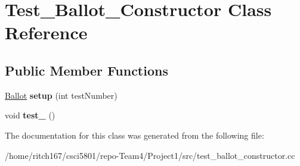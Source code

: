 \hypertarget{classTest__Ballot__Constructor}{}\section{Test\+\_\+\+Ballot\+\_\+\+Constructor Class Reference}
\label{classTest__Ballot__Constructor}
\subsection*{Public Member Functions}
\begin{DoxyCompactItemize}
\item 
\mbox{\label{classTest__Ballot__Constructor_a5c318b358ad6ad7e53a450a3e570a2aa}} 
\hyperlink{classBallot}{Ballot} {\bfseries setup} (int test\+Number)
\item 
\mbox{\label{classTest__Ballot__Constructor_a8236944b2cb7574bd431c7db00a3088c}} 
void {\bfseries test\+\_} ()
\end{DoxyCompactItemize}


The documentation for this class was generated from the following file\+:\begin{DoxyCompactItemize}
\item 
/home/ritch167/csci5801/repo-\/\+Team4/\+Project1/src/test\+\_\+ballot\+\_\+constructor.\+cc\end{DoxyCompactItemize}
